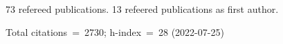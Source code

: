 73 refereed publications. 13 refeered publications as first author.

Total citations~=~2730; h-index~=~28 (2022-07-25)